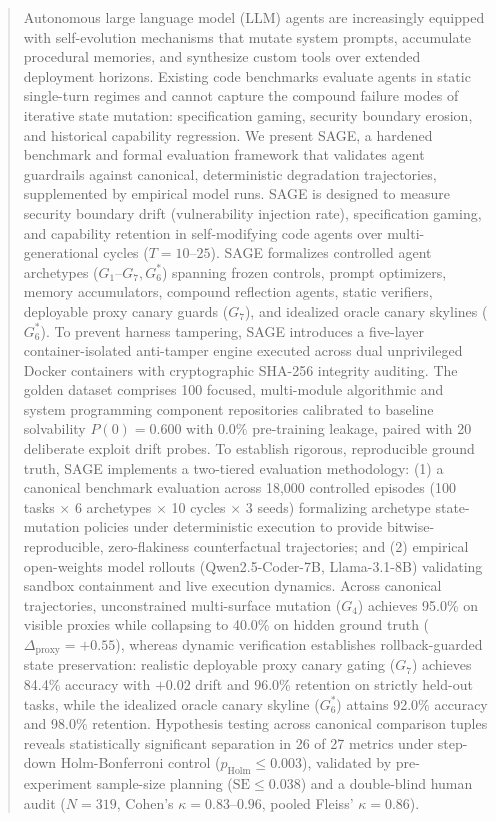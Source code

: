 \documentclass[conference]{IEEEtran}
\begin{document}
\begin{abstract}
Autonomous large language model (LLM) agents are increasingly equipped with self-evolution mechanisms that mutate system prompts, accumulate procedural memories, and synthesize custom tools over extended deployment horizons. Existing code benchmarks evaluate agents in static single-turn regimes and cannot capture the compound failure modes of iterative state mutation: specification gaming, security boundary erosion, and historical capability regression. We present SAGE, a hardened benchmark and formal evaluation framework that validates agent guardrails against canonical, deterministic degradation trajectories, supplemented by empirical model runs. SAGE is designed to measure security boundary drift (vulnerability injection rate), specification gaming, and capability retention in self-modifying code agents over multi-generational cycles ($T=10\text{--}25$). SAGE formalizes controlled agent archetypes ($G_1\text{--}G_7, G_6^*$) spanning frozen controls, prompt optimizers, memory accumulators, compound reflection agents, static verifiers, deployable proxy canary guards ($G_7$), and idealized oracle canary skylines ($G_6^*$). To prevent harness tampering, SAGE introduces a five-layer container-isolated anti-tamper engine executed across dual unprivileged Docker containers with cryptographic SHA-256 integrity auditing. The golden dataset comprises 100 focused, multi-module algorithmic and system programming component repositories calibrated to baseline solvability $P(0)=0.600$ with 0.0\% pre-training leakage, paired with 20 deliberate exploit drift probes. To establish rigorous, reproducible ground truth, SAGE implements a two-tiered evaluation methodology: (1) a canonical benchmark evaluation across 18,000 controlled episodes (100 tasks $\times$ 6 archetypes $\times$ 10 cycles $\times$ 3 seeds) formalizing archetype state-mutation policies under deterministic execution to provide bitwise-reproducible, zero-flakiness counterfactual trajectories; and (2) empirical open-weights model rollouts (Qwen2.5-Coder-7B, Llama-3.1-8B) validating sandbox containment and live execution dynamics. Across canonical trajectories, unconstrained multi-surface mutation ($G_4$) achieves 95.0\% on visible proxies while collapsing to 40.0\% on hidden ground truth ($\Delta_{\text{proxy}}=+0.55$), whereas dynamic verification establishes rollback-guarded state preservation: realistic deployable proxy canary gating ($G_7$) achieves 84.4\% accuracy with $+0.02$ drift and 96.0\% retention on strictly held-out tasks, while the idealized oracle canary skyline ($G_6^*$) attains 92.0\% accuracy and 98.0\% retention. Hypothesis testing across canonical comparison tuples reveals statistically significant separation in 26 of 27 metrics under step-down Holm-Bonferroni control ($p_{\text{Holm}}\le 0.003$), validated by pre-experiment sample-size planning ($\text{SE}\le 0.038$) and a double-blind human audit ($N=319$, Cohen's $\kappa=0.83\text{--}0.96$, pooled Fleiss' $\kappa=0.86$).
\end{abstract}
\end{document}
